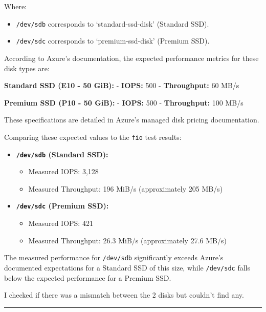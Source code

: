 \documentclass[11pt]{article}
\providecommand{\tightlist}{%
      \setlength{\itemsep}{0pt}\setlength{\parskip}{0pt}}
\begin{document}
Where:

\begin{itemize}
\tightlist
\item
  \texttt{/dev/sdb} corresponds to `standard-ssd-disk' (Standard SSD).
\item
  \texttt{/dev/sdc} corresponds to `premium-ssd-disk' (Premium SSD).
\end{itemize}

According to Azure's documentation, the expected performance metrics for
these disk types are:

\textbf{Standard SSD (E10 - 50 GiB):} - \textbf{IOPS:} 500 -
\textbf{Throughput:} 60 MB/s

\textbf{Premium SSD (P10 - 50 GiB):} - \textbf{IOPS:} 500 -
\textbf{Throughput:} 100 MB/s

These specifications are detailed in Azure's managed disk pricing
documentation.

Comparing these expected values to the \texttt{fio} test results:

\begin{itemize}
\tightlist
\item
  \textbf{\texttt{/dev/sdb} (Standard SSD):}

  \begin{itemize}
  \tightlist
  \item
    Measured IOPS: 3,128
  \item
    Measured Throughput: 196 MiB/s (approximately 205 MB/s)
  \end{itemize}
\item
  \textbf{\texttt{/dev/sdc} (Premium SSD):}

  \begin{itemize}
  \tightlist
  \item
    Measured IOPS: 421
  \item
    Measured Throughput: 26.3 MiB/s (approximately 27.6 MB/s)
  \end{itemize}
\end{itemize}

The measured performance for \texttt{/dev/sdb} significantly exceeds
Azure's documented expectations for a Standard SSD of this size, while
\texttt{/dev/sdc} falls below the expected performance for a Premium
SSD.

I checked if there was a mismatch between the 2 disks but couldn't find
any.

\begin{center}\rule{0.5\linewidth}{0.5pt}\end{center}
\end{document}
